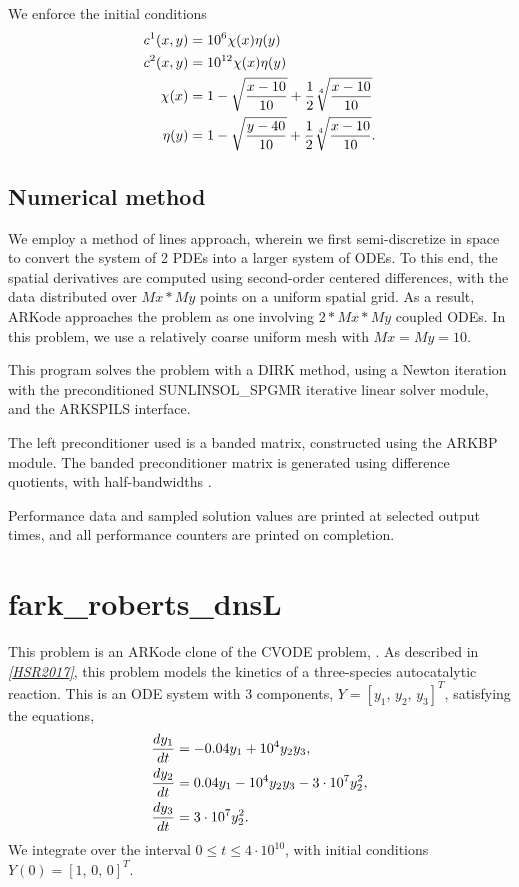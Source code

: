 \documentclass[letterpaper,10pt,english]{sphinxmanual}
\begin{document}
We enforce the initial conditions
\begin{gather}
\begin{split}c^1(x,y) &=  10^6 \chi(x)\eta(y) \\
c^2(x,y) &=  10^{12} \chi(x)\eta(y) \\
\chi(x) &= 1 - \sqrt{\frac{x - 10}{10}} + \frac12 \sqrt[4]{\frac{x - 10}{10}} \\
\eta(y) &= 1 - \sqrt{\frac{y - 40}{10}} + \frac12 \sqrt[4]{\frac{x - 10}{10}}.\end{split}\notag
\end{gather}

\subsection{Numerical method}
\label{f77_serial:numerical-method}
We employ a method of lines approach, wherein we first semi-discretize
in space to convert the system of 2 PDEs into a larger system of ODEs.
To this end, the spatial derivatives are computed using second-order
centered differences, with the data distributed over \(Mx*My\)
points on a uniform spatial grid.  As a result, ARKode approaches the
problem as one involving \(2*Mx*My\) coupled ODEs. In this
problem, we use a relatively coarse uniform mesh with
\(Mx=My=10\).

This program solves the problem with a DIRK method, using a Newton
iteration with the preconditioned SUNLINSOL\_SPGMR iterative linear
solver module, and the ARKSPILS interface.

The left preconditioner used is a banded matrix, constructed using
the ARKBP module.  The banded preconditioner matrix is generated using
difference quotients, with half-bandwidths .

Performance data and sampled solution values are printed at
selected output times, and all performance counters are printed
on completion.


\section{fark\_roberts\_dnsL}
\label{f77_serial:fark-roberts-dnsl}\label{f77_serial:id3}
This problem is an ARKode clone of the CVODE problem,
.  As described in \label{f77_serial:id4}{\hyperref[References:hsr2017]{\emph{{[}HSR2017{]}}}}, this problem models
the kinetics of a three-species autocatalytic reaction.  This is an
ODE system with 3 components, \(Y = [y_1,\, y_2,\, y_3]^T\),
satisfying the equations,
\begin{gather}
\begin{split}\frac{d y_1}{dt} &= -0.04 y_1 + 10^4 y_2 y_3, \\
\frac{d y_2}{dt} &= 0.04 y_1 - 10^4 y_2 y_3 - 3\cdot10^7 y_2^2, \\
\frac{d y_3}{dt} &= 3\cdot10^7 y_2^2.\end{split}\notag
\end{gather}
We integrate over the interval \(0\le t\le 4\cdot10^{10}\), with initial
conditions  \(Y(0) = [1,\, 0,\, 0]^T\).
\end{document}
